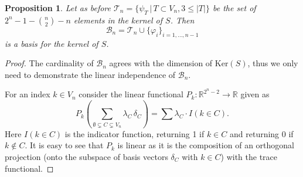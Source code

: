 \documentclass[10pt,a4paper]{amsart}
\newtheorem{proposition}{Proposition}
\newcommand{\kerr}{\text{Ker}}
\begin{document}
\begin{proposition} \label{Proposition with the basis for the kernel}
Let as before $\mathcal T_n = \{\psi_T\,|\, T\subset V_n, 3\le|T|\}$ be the set of $2^n-1-{n\choose 2}-n$ elements in the kernel of $S$. Then 
$$\mathcal B_n = \mathcal T_n \cup \{\varphi_i\}_{i=1,\dots, n-1}$$
is a basis for the kernel of $S$.  
\end{proposition}

\begin{proof}
The cardinality of $\mathcal B_n$ agrees with the dimension of $\kerr(S)$, thus we only need to demonstrate the linear independence of $\mathcal B_n$. 

For an index $k\in V_n$ consider the linear functional $P_k:\mathbb R^{2^n-2}\to \mathbb R$ given as 
$$P_k\left( \sum_{\emptyset\subsetneq C \subsetneq V_n} \lambda _C\, \delta_C\right) = \sum \lambda _C \cdot I(k\in C). $$
Here $I(k\in C)$ is the indicator function, returning 1 if $k\in C$ and returning $0$ if $k\notin C$. It is easy to see that $P_k$ is linear as it is the composition of an orthogonal projection (onto the subspace of basis vectors $\delta_C$ with $k\in C$) with the trace functional. 


\end{proof}
\end{document}
